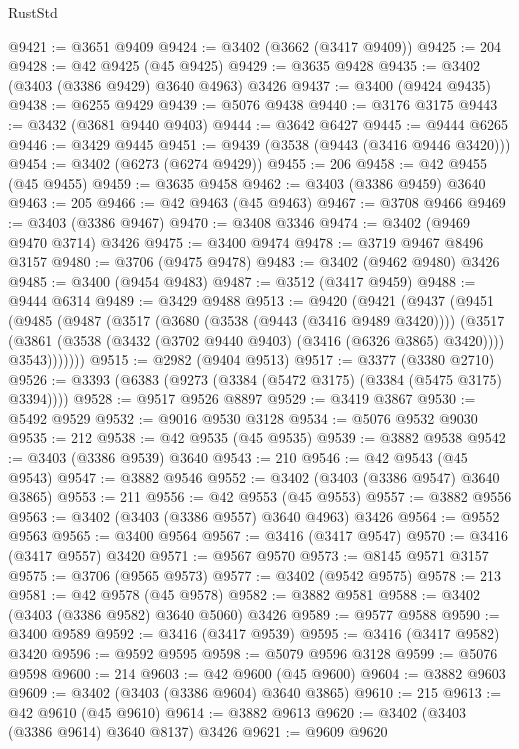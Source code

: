\begin{lexlean}{RustStd}
\begin{coremodule}
@9421 := @3651 @9409
@9424 := @3402 (@3662 (@3417 @9409))
@9425 := 204
@9428 := @42 @9425 (@45 @9425)
@9429 := @3635 @9428
@9435 := @3402 (@3403 (@3386 @9429) @3640 @4963) @3426
@9437 := @3400 (@9424 @9435)
@9438 := @6255 @9429
@9439 := @5076 @9438
@9440 := @3176 @3175
@9443 := @3432 (@3681 @9440 @9403)
@9444 := @3642 @6427
@9445 := @9444 @6265
@9446 := @3429 @9445
@9451 := @9439 (@3538 (@9443 (@3416 @9446 @3420)))
@9454 := @3402 (@6273 (@6274 @9429))
@9455 := 206
@9458 := @42 @9455 (@45 @9455)
@9459 := @3635 @9458
@9462 := @3403 (@3386 @9459) @3640
@9463 := 205
@9466 := @42 @9463 (@45 @9463)
@9467 := @3708 @9466
@9469 := @3403 (@3386 @9467)
@9470 := @3408 @3346
@9474 := @3402 (@9469 @9470 @3714) @3426
@9475 := @3400 @9474
@9478 := @3719 @9467 @8496 @3157
@9480 := @3706 (@9475 @9478)
@9483 := @3402 (@9462 @9480) @3426
@9485 := @3400 (@9454 @9483)
@9487 := @3512 (@3417 @9459)
@9488 := @9444 @6314
@9489 := @3429 @9488
@9513 := @9420
    (@9421
      (@9437
        (@9451
          (@9485
            (@9487
              (@3517
                (@3680 (@3538 (@9443 (@3416 @9489 @3420))))
                (@3517
                  (@3861 (@3538 (@3432 (@3702 @9440 @9403) (@3416 (@6326 @3865) @3420))))
                  @3543)))))))
@9515 := @2982 (@9404 @9513)
@9517 := @3377 (@3380 @2710)
@9526 := @3393 (@6383 (@9273 (@3384 (@5472 @3175) (@3384 (@5475 @3175) @3394))))
@9528 := @9517 @9526 @8897
@9529 := @3419 @3867
@9530 := @5492 @9529
@9532 := @9016 @9530 @3128
@9534 := @5076 @9532 @9030
@9535 := 212
@9538 := @42 @9535 (@45 @9535)
@9539 := @3882 @9538
@9542 := @3403 (@3386 @9539) @3640
@9543 := 210
@9546 := @42 @9543 (@45 @9543)
@9547 := @3882 @9546
@9552 := @3402 (@3403 (@3386 @9547) @3640 @3865)
@9553 := 211
@9556 := @42 @9553 (@45 @9553)
@9557 := @3882 @9556
@9563 := @3402 (@3403 (@3386 @9557) @3640 @4963) @3426
@9564 := @9552 @9563
@9565 := @3400 @9564
@9567 := @3416 (@3417 @9547)
@9570 := @3416 (@3417 @9557) @3420
@9571 := @9567 @9570
@9573 := @8145 @9571 @3157
@9575 := @3706 (@9565 @9573)
@9577 := @3402 (@9542 @9575)
@9578 := 213
@9581 := @42 @9578 (@45 @9578)
@9582 := @3882 @9581
@9588 := @3402 (@3403 (@3386 @9582) @3640 @5060) @3426
@9589 := @9577 @9588
@9590 := @3400 @9589
@9592 := @3416 (@3417 @9539)
@9595 := @3416 (@3417 @9582) @3420
@9596 := @9592 @9595
@9598 := @5079 @9596 @3128
@9599 := @5076 @9598
@9600 := 214
@9603 := @42 @9600 (@45 @9600)
@9604 := @3882 @9603
@9609 := @3402 (@3403 (@3386 @9604) @3640 @3865)
@9610 := 215
@9613 := @42 @9610 (@45 @9610)
@9614 := @3882 @9613
@9620 := @3402 (@3403 (@3386 @9614) @3640 @8137) @3426
@9621 := @9609 @9620

\end{coremodule}
\end{lexlean}
